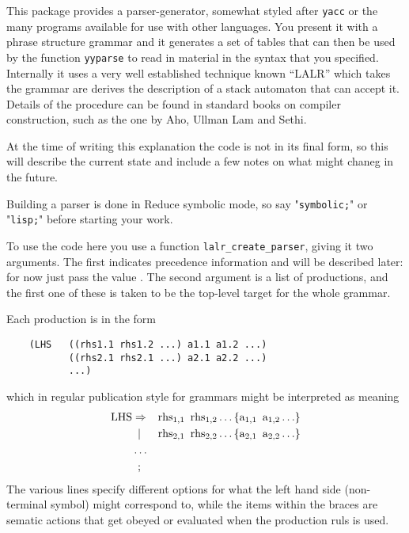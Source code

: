 
This package provides a parser-generator, somewhat styled after
\texttt{yacc} or the many programs available for use with other
languages. You present it with a phrase structure grammar and it
generates a set of tables that can then be used by the function
\texttt{yyparse} to read in material in the syntax that you specified.
Internally it uses a very well established technique known ``LALR'' which
takes the grammar are derives the description of a stack automaton that
can accept it. Details of the procedure can be found in standard books
on compiler construction, such as the one by Aho, Ullman Lam and Sethi.

At the time of writing this explanation the code is not in its final form,
so this will describe the current state and include a few notes on what
might chaneg in the future.

Building a parser is done in Reduce symbolic mode, so say "\texttt{symbolic;}" 
or "\texttt{lisp;}" before starting your work.

To use the code here you use a function \texttt{lalr\_create\_parser},
giving it two arguments. The first indicates precedence information and
will be described later: for now just pass the value .
The second argument is a list of productions, and the first one of these
is taken to be the top-level target for the whole grammar.

Each production is in the form
\begin{verbatim}
    (LHS   ((rhs1.1 rhs1.2 ...) a1.1 a1.2 ...)
           ((rhs2.1 rhs2.1 ...) a2.1 a2.2 ...)
           ...)
\end{verbatim}
\noindent which in regular publication style for grammars might be interpreted
as meaning
\begin{align*}
\text{LHS} & \Rightarrow & \text{rhs}_{1,1} \hspace{0.5em} \text{rhs}_{1,2} \ldots  & \left\{ \text{a}_{1,1} \hspace{0.5em} \text{a}_{1,2} \ldots \right\} \\
    & \hspace{0.5em}| & \text{rhs}_{2,1} \hspace{0.5em} \text{rhs}_{2,2} \ldots & \left\{ \text{a}_{2,1} \hspace{0.5em} \text{a}_{2,2} \ldots \right\} \\
    & \ldots  \\
    & \hspace{0.5em};
\end{align*}
The various lines specify different options for what the left hand side
(non-terminal symbol) might correspond to, while the items within the
braces are sematic actions that get obeyed or evaluated when the
production ruls is used.

